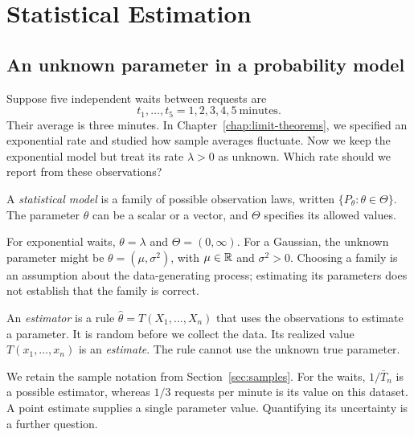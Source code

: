 \chapter{Statistical Estimation}
\label{chap:estimation}

\begingroup
{}


\section{An unknown parameter in a probability model}
\label{sec:estimation-model}

Suppose five independent waits between requests are
\[
  t_1,\ldots,t_5=1,2,3,4,5\ \text{minutes}.
\]
Their average is three minutes. In Chapter~\ref{chap:limit-theorems},
we specified an exponential rate and studied how sample averages fluctuate.
Now we keep the exponential model but treat its rate \(\lambda>0\) as
unknown. Which rate should we report from these observations?

\begin{definition}
A \emph{statistical model} is a family of possible observation laws,
written \(\{P_\theta:\theta\in\Theta\}\). The parameter \(\theta\)
can be a scalar or a vector, and \(\Theta\) specifies its allowed values.
\end{definition}
For exponential waits, \(\theta=\lambda\) and \(\Theta=(0,\infty)\).
For a Gaussian, the unknown parameter might be \(\theta=(\mu,\sigma^2)\),
with \(\mu\in\mathbb{R}\) and \(\sigma^2>0\). Choosing a family is an
assumption about the data-generating process; estimating its parameters
does not establish that the family is correct.

\begin{definition}
An \emph{estimator} is a rule \(\widehat\theta=T(X_1,\ldots,X_n)\)
that uses the observations to estimate a parameter. It is random before
we collect the data. Its realized value \(T(x_1,\ldots,x_n)\) is an
\emph{estimate}. The rule cannot use the unknown true parameter.
\end{definition}

We retain the sample notation from Section~\ref{sec:samples}. For the waits,
\(1/\bar T_n\) is a possible estimator, whereas \(1/3\) requests per minute
is its value on this dataset. A point estimate supplies a single parameter
value. Quantifying its uncertainty is a further question.

